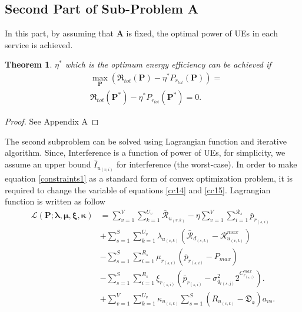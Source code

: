 \documentclass[conference]{IEEEtran}
\newtheorem{theorem}{Theorem}
\begin{document}
\subsection{Second Part of Sub-Problem A}\label{secondsub}
In this part, by assuming that $\boldsymbol{A}$ is fixed, the optimal power of UEs in each service is achieved.
\begin{theorem}\label{t2}
 $\eta^*$ which is the optimum energy efficiency can be achieved if
\begin{equation}\label{q2}
\begin{split}
&\max \limits_{\boldsymbol{P}} (\mathfrak{R}_{tot}(\boldsymbol{P}) - \eta^* P_{r_{tot}}(\boldsymbol{P}))=\\
& \mathfrak{R}_{tot}(\boldsymbol{P}^*) - \eta^* P_{r_{tot}}(\boldsymbol{P}^*) =0.
\end{split}
\end{equation}
\end{theorem}
\begin{proof}
See Appendix A
\end{proof}
The second subproblem can  be solved using Lagrangian function and iterative algorithm. 
Since, Interference is a function of power of UEs, for simplicity, we assume an upper bound $\bar{I}_{u_{(v,i)}}$ for interference (the worst-case). 
In order to make equation \eqref{constraints1} as a standard form of convex optimization problem, it is required to change the variable of equations \eqref{cc14} and \eqref{cc15}.
Lagrangian function is written as follow
\begin{equation}\label{lagrang}
\begin{split}
\mathcal{L}(\boldsymbol{P}; \boldsymbol{\lambda}, \boldsymbol{\mu}, \boldsymbol{ \xi}, \boldsymbol{ \kappa}) & = \sum\limits_{v=1}^{V} \sum\limits_{k=1}^{U_v}\mathcal{\bar{R}}_{u_{(v,k)}} 
- \eta \sum\limits_{v=1}^{V} \sum\limits_{i=1}^{\mathcal{R}_s}\bar{p}_{r_{(s,i)}}\\
&+\sum\limits_{s=1}^{S} \sum\limits_{k=1}^{U_v} \lambda_{u_{(v,k)}} (\mathcal{\bar{R}}_{d_{(s,k)}}-\mathcal{R}_{u_{(v,k)}}^{max})\\
&- \sum\limits_{s=1}^{S} \sum\limits_{i=1}^{R_s} \mu_{r_{(s,i)}} (\bar{p}_{r_{(s,i)}}-P_{max})\\
&- \sum\limits_{s=1}^{S} \sum\limits_{i=1}^{R_s} \xi_{r_{(s,i)}} (\bar{p}_{r_{(s,i)}}-\sigma_{q_{r(s,j)}}^2 2^{C_{r_{(s,i)}}^{max}}).\\ 
&+ \sum\limits_{v=1}^{V} \sum\limits_{k=1}^{U_v} \kappa_{u_{(v,k)}} \sum\limits_{s=1}^{S}(R_{u_{(v,k)}} -\mathfrak{D_s})a_{vs}.\\ 
\end{split}
\end{equation}
\end{document}
